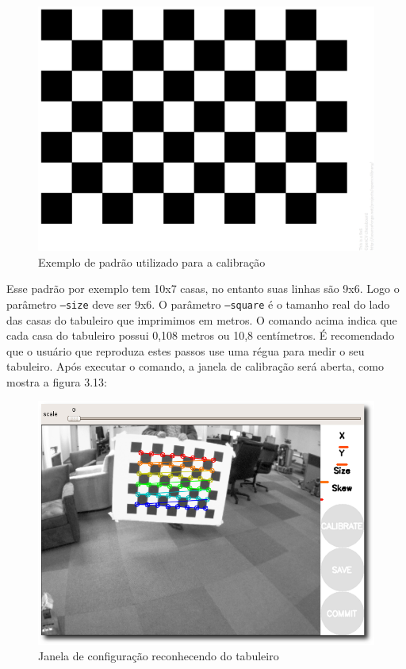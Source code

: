 \begin{figure}[H]
	\centering
		\includegraphics[width= \textwidth]{Imagens/figura3-3E3-12.png}
	\caption{Exemplo de padrão utilizado para a calibração}
	\label{fig3:12}
\end{figure}


Esse padrão por exemplo tem 10x7 casas, no entanto suas linhas são 9x6. Logo o parâmetro \texttt{--size} deve ser 9x6.
O parâmetro \texttt{--square} é o tamanho real do lado das casas do tabuleiro que imprimimos em metros. O comando acima indica que cada casa do tabuleiro possui 0,108 metros ou 10,8 centímetros. É recomendado que o usuário que reproduza estes passos use uma régua para medir o seu tabuleiro.
Após executar o comando, a janela de calibração será aberta, como mostra a figura 3.13:

\begin{figure}[H]
	\centering
		\includegraphics[width= \textwidth]{Imagens/figura3-13.png}
	\caption{Janela de configuração reconhecendo do tabuleiro \cite{Documentacao-CalibrateMonocularCamera}}
	\label{fig3:13}
\end{figure}

